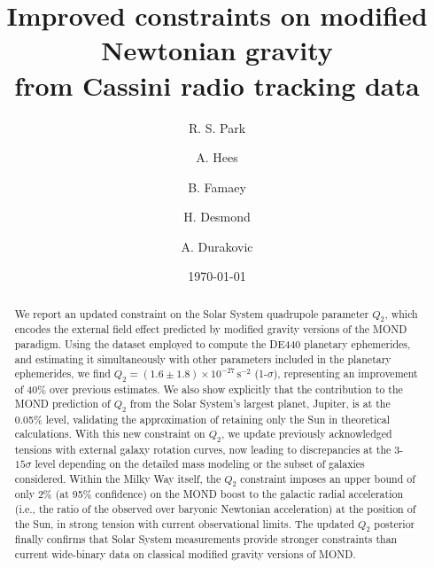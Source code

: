 \documentclass[reprint,nofootinbib,prd,aps]{revtex4-2}
\begin{document}

\title{Improved constraints on modified Newtonian gravity \\ from Cassini radio tracking data}%


\author{R. S. Park}
%


\author{A. Hees}
%

\author{B. Famaey}
%

\author{H. Desmond}
%

\author{A. Durakovic}
%


\date{\today}

\begin{abstract}
We report an updated constraint on the Solar System quadrupole parameter $Q_2$, which encodes the external field effect predicted by modified gravity versions of the MOND paradigm. Using the dataset employed to compute the DE440 planetary ephemerides, and estimating it simultaneously with other parameters included in the planetary ephemerides, we find $Q_2 = (1.6 \pm 1.8) \times 10^{-27}\,\mathrm{s}^{-2}$ (1-$\sigma$), representing an improvement of 40\% over previous estimates. We also show explicitly that the contribution to the MOND prediction of $Q_2$ from the Solar System’s largest planet, Jupiter, is at the 0.05\% level, validating the approximation of retaining only the Sun in theoretical calculations. With this new constraint on $Q_2$, we update previously acknowledged tensions with external galaxy rotation curves, now leading to discrepancies at the $3$-$15\sigma$ level depending on the detailed mass modeling or the subset of galaxies considered. Within the Milky Way itself, the $Q_2$ constraint imposes an upper bound of only 2\% (at 95\% confidence) on the MOND boost to the galactic radial acceleration (i.e., the ratio of the observed over baryonic Newtonian acceleration) at the position of the Sun, in strong tension with current observational limits. The updated $Q_2$ posterior finally confirms that Solar System measurements provide stronger constraints than current wide-binary data on classical modified gravity versions of MOND. 

\end{abstract}
\end{document}
